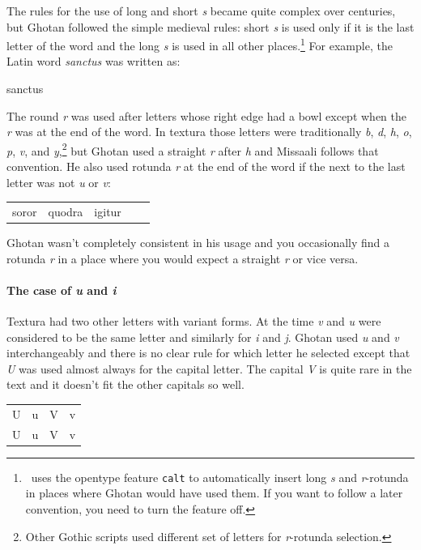 \documentclass[a4paper, 12pt]{article}
\newcommand{\feature}[1]{\texttt{#1}}
\newcommand{\sample}[1]{{\mstexturafamily\fontsize{18}{18}\selectfont #1}}
\begin{document}
The rules for the use of long and short \emph{s} became quite complex
over centuries, but Ghotan followed the simple medieval rules: short
\emph{s} is used only if it is the last letter of the word and the
long \emph{s} is used in all other places.\footnote{\Missaali\ uses
  the opentype feature \feature{calt} to automatically insert long
  \emph{s} and \emph{r}-rotunda in places where Ghotan would have used
  them. If you want to follow a later convention, you need to turn the
  feature off.} For example, the Latin word \emph{sanctus} was written
as:
\begin{center}
  \sample{sanctus}
\end{center}

The round \emph{r} was used after letters whose right edge had a bowl
except when the \emph{r} was at the end of the word. In textura those
letters were traditionally \emph{b}, \emph{d}, \emph{h}, \emph{o},
\emph{p}, \emph{v}, and \emph{y},\footnote{Other Gothic scripts used
  different set of letters for \emph{r}-rotunda selection.} but Ghotan
used a straight \emph{r} after \emph{h} and Missaali follows that
convention. He also used rotunda \emph{r} at the end of the word if
the next to the last letter was not \emph{u} or \emph{v}:
\begin{center}
  \begin{tabular}{ccccc}
    \sample{soror} & \sample{quodra} & \sample{igitur}\\
  \end{tabular}
\end{center}
Ghotan wasn't completely consistent in his usage and you occasionally
find a rotunda \emph{r} in a place where you would expect a straight
\emph{r} or vice versa. 

\paragraph{The case of \emph{u} and \emph{i}}

Textura had two other letters with variant forms. At the time \emph{v}
and \emph{u} were considered to be the same letter and similarly for
\emph{i} and \emph{j}. Ghotan used \emph{u} and \emph{v}
interchangeably and there is no clear rule for which letter he
selected except that \emph{U} was used almost always for the capital
letter. The capital \emph{V} is quite rare in the text and it doesn't
fit the other capitals so well.
\begin{center}
  \begin{tabular}{cccc}
    \sample{U} & \sample{u} & \sample{V} & \sample{v} \\
    U & u & V & v \\
  \end{tabular}
\end{center}
\end{document}
